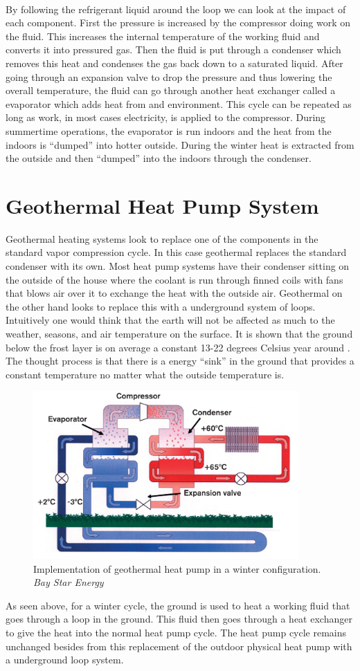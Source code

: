 \setcounter{figure}{2}
%
\\
\noindent
By following the refrigerant liquid around the loop we can look at the impact of each component. First the pressure is increased by the compressor doing work on the fluid. This increases the internal temperature of the working fluid and converts it into pressured gas. Then the fluid is put through a condenser which removes this heat and condenses the gas back down to a saturated liquid. After going through an expansion valve to drop the pressure and thus lowering the overall temperature, the fluid can go through another heat exchanger called a evaporator which adds heat from and environment. This cycle can be repeated as long as work, in most cases electricity, is applied to the compressor. During summertime operations, the evaporator is run indoors and the heat from the indoors is ``dumped'' into hotter outside. During the winter heat is extracted from the outside and then ``dumped'' into the indoors through the condenser.
%
%
\section{Geothermal Heat Pump System}
Geothermal heating systems look to replace one of the components in the standard vapor compression cycle. In this case geothermal replaces the standard condenser with its own. Most heat pump systems have their condenser sitting on the outside of the house where the coolant is run through finned coils with fans that blows air over it to exchange the heat with the outside air. Geothermal on the other hand looks to replace this with a underground system of loops. Intuitively one would think that the earth will not be affected as much to the weather, seasons, and air temperature on the surface. It is shown that the ground below the frost layer is on average a constant 13-22 degrees Celsius year around \cite{NRCSScan}. The thought process is that there is a energy ``sink'' in the ground that provides a constant temperature no matter what the outside temperature is.
%
\begin{figure}[H]
    \centering
    \includegraphics[width=4in]{pictures/Geothermal-Heatpump.png}
    \caption{Implementation of geothermal heat pump in a winter configuration. \textit{Bay Star Energy \cite{HowHeatPumpWorks}}}
\end{figure}
%
\noindent
As seen above, for a winter cycle, the ground is used to heat a working fluid that goes through a loop in the ground. This fluid then goes through a heat exchanger to give the heat into the normal heat pump cycle. The heat pump cycle remains unchanged besides from this replacement of the outdoor physical heat pump with a underground loop system.